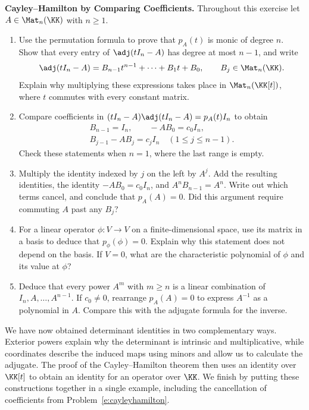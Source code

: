 \documentclass[12pt,reqno]{amsart}
\begin{document}
\begin{problems}
\item\label{e:cayleyhamilton} \textbf{Cayley--Hamilton by Comparing Coefficients.} Throughout this exercise let $A\in\Mat_n(\KK)$ with $n\geq1$.
\begin{enumerate}
\item Use the permutation formula to prove that $p_A(t)$ is monic of degree $n$. Show that every entry of $\adj(tI_n-A)$ has degree at most $n-1$, and write
\[
\adj(tI_n-A)=B_{n-1}t^{n-1}+\cdots+B_1t+B_0,\qquad B_j\in\Mat_n(\KK).
\]
Explain why multiplying these expressions takes place in $\Mat_n(\KK[t])$, where $t$ commutes with every constant matrix.
\item Compare coefficients in $(tI_n-A)\adj(tI_n-A)=p_A(t)I_n$ to obtain
\[
\begin{gathered}
B_{n-1}=I_n,\qquad -AB_0=c_0I_n,\\
B_{j-1}-AB_j=c_jI_n\quad(1\leq j\leq n-1).
\end{gathered}
\]
Check these statements when $n=1$, where the last range is empty.
\item Multiply the identity indexed by $j$ on the left by $A^j$. Add the resulting identities, the identity $-AB_0=c_0I_n$, and $A^nB_{n-1}=A^n$. Write out which terms cancel, and conclude that $p_A(A)=0$. Did this argument require commuting $A$ past any $B_j$?
\item For a linear operator $\phi:V\to V$ on a finite-dimensional space, use its matrix in a basis to deduce that $p_{\phi}(\phi)=0$. Explain why this statement does not depend on the basis. If $V=0$, what are the characteristic polynomial of $\phi$ and its value at $\phi$?
\item Deduce that every power $A^m$ with $m\geq n$ is a linear combination of $I_n,A,\ldots,A^{n-1}$. If $c_0\ne0$, rearrange $p_A(A)=0$ to express $A^{-1}$ as a polynomial in $A$. Compare this with the adjugate formula for the inverse.
\end{enumerate}
\end{problems}

\hrulefill

We have now obtained determinant identities in two complementary ways. Exterior powers explain why the determinant is intrinsic and multiplicative, while coordinates describe the induced maps using minors and allow us to calculate the adjugate. The proof of the Cayley--Hamilton theorem then uses an identity over $\KK[t]$ to obtain an identity for an operator over $\KK$. We finish by putting these constructions together in a single example, including the cancellation of coefficients from Problem~\ref{e:cayleyhamilton}.
\end{document}
